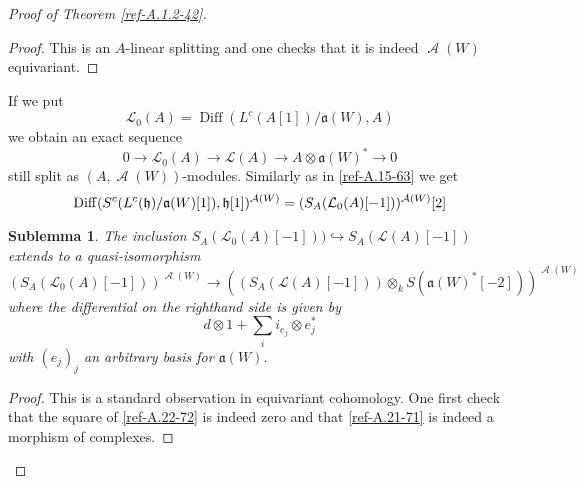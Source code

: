 \documentclass{amsart}
\numberwithin{equation}{section}
\let\cal\mathcal
\newtheorem*{sublemma}{Sublemma}
\theoremstyle{definition}
\theoremstyle{remark}
\begin{document}
\begin{proof}[Proof of Theorem \ref{ref-A.1.2-42}]
\begin{proof}
This is an $A$-linear splitting and one checks that it is indeed
${\operatorname{{\cal A}}}(W)$ equivariant. 
\end{proof}
If we  put
\[
{{\cal L}}_0(A)={\operatorname{Diff}}(L^{c}(A[1])/{\mathfrak{a}}(W),A)
\]
we obtain an exact sequence
\begin{equation}
\label{ref-A.20-70}
0\rightarrow {{\cal L}}_0(A)\rightarrow {{\cal L}}(A)\rightarrow A\otimes {\mathfrak{a}}(W)^\ast\rightarrow 0
\end{equation}
still split as $(A,{\operatorname{{\cal A}}}(W))$-modules. Similarly as in \eqref{ref-A.15-63} we get
\[
{\operatorname{Diff}}(S^c(L^c(\frak{h})/{\mathfrak{a}}(W)[1]),\frak{h}[1])^{{\operatorname{{\cal A}}}(W)}=
(S_A({{\cal L}}_0(A)[-1]))^{{\operatorname{{\cal A}}}(W)}[2]
\]
\begin{sublemma} The inclusion $S_A({{\cal L}}_0(A)[-1]))\hookrightarrow 
S_A({{\cal L}}(A)[-1])$ extends to a quasi-isomorphism
\begin{equation}
\label{ref-A.21-71}
(S_A({{\cal L}}_0(A)[-1]))^{{\operatorname{{\cal A}}}(W)}{\rightarrow}
((S_A({{\cal L}}(A)[-1]))\otimes_k S({\mathfrak{a}}(W)^\ast[-2]))^{{\operatorname{{\cal A}}}(W)}
\end{equation}
where the differential on the righthand side is given by
\begin{equation}
\label{ref-A.22-72}
d\otimes 1+\sum_i i_{e_j}\otimes e_j^\ast
\end{equation}
with $(e_j)_j$ an arbitrary basis for ${\mathfrak{a}}(W)$. 
\end{sublemma}
\begin{proof} This is a standard observation in equivariant
  cohomology. One first check that the square of \eqref{ref-A.22-72} is indeed
zero and that \eqref{ref-A.21-71} is indeed a morphism of complexes.


\end{proof}
\end{proof}
\end{document}
